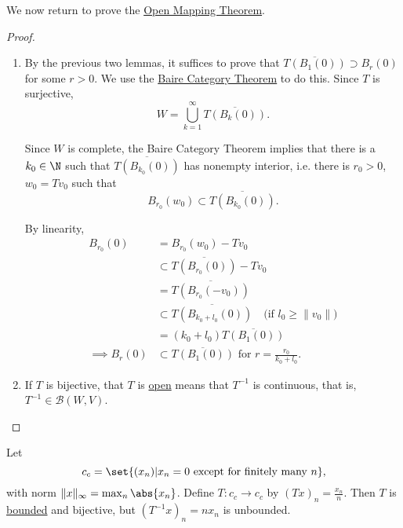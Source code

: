 \documentclass{article}
\begin{document}
We now return to prove the \hyperlink{thm:omt}{Open Mapping Theorem}.
\begin{proof}
    \leavevmode
    \begin{enumerate}[label=(\roman*)]
        \item By the previous two lemmas, it suffices to prove that $\overline{T(B_1(0))} \supset B_r(0)$ for some $r > 0$. We use the \hyperlink{thm:baireCategory}{Baire Category Theorem} to do this. Since $T$ is surjective,
            \begin{equation*}
                W = \bigcup_{k=1}^\infty \overline{T(B_k(0))}.
            \end{equation*}

            Since $W$ is complete, the Baire Category Theorem implies that there is a $k_0 \in \N$ such that $\overline{T(B_{k_0}(0))}$ has nonempty interior, i.e. there is $r_0 > 0$, $w_0 = T v_0$ such that
            \begin{equation*}
                B_{r_0}(w_0) \subset \overline{T(B_{k_0}(0))}.
            \end{equation*}

            By linearity,
            \begin{align*}
                B_{r_0}(0) &= B_{r_0}(w_0) - T v_0 \\
                           &\subset \overline{T(B_{r_0}(0))} - T v_0 \\
                           &= \overline{T(B_{r_0}(-v_0))} \\
                           &\subset \overline{T(B_{k_0 + l_0}(0))}  \quad \text{(if $l_0 \geq \|v_0\|$)}\\
                           &= (k_0 + l_0) \overline{T(B_1(0))} \\
                \implies B_r(0) &\subset \overline{T(B_1(0))}\text{ for }r = \frac{r_0}{k_0 + l_0}.
            \end{align*}

        \item If $T$ is bijective, that $T$ is \hyperlink{def:openMap}{open} means that $T^{-1}$ is continuous, that is, $T^{-1} \in \mathcal{B}(W, V)$. \qedhere
    \end{enumerate}
\end{proof}

\begin{eg}
    Let \begin{equation*}c_c = \set{(x_n) | x_n = 0 \text{ except for finitely many } n},\end{equation*} with norm $\|x\|_\infty = \max_n \abs{x_n}$.
    Define $T: c_c \to c_c$ by $(T x)_n = \frac{x_n}{n}$.
    Then $T$ is \hyperlink{def:boundedLinearMap}{bounded} and bijective, but $(T^{-1} x)_n = n x_n$ is unbounded.
\end{eg}
\end{document}
